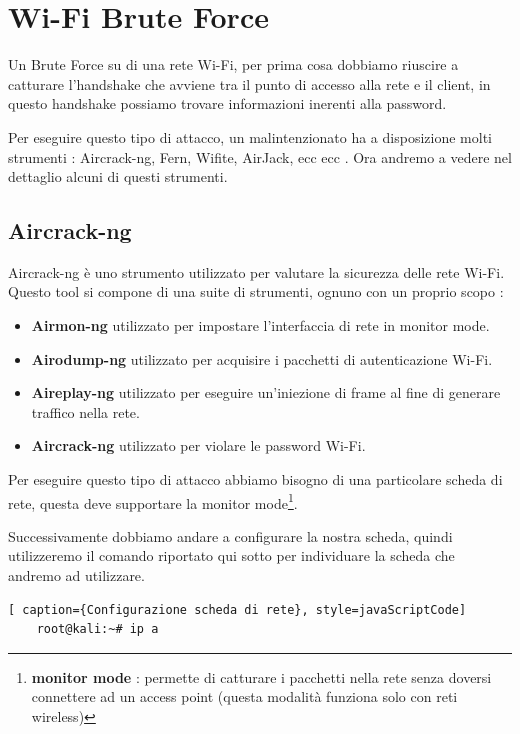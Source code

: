 \chapter{Wi-Fi Brute Force}

Un Brute Force su di una rete Wi-Fi, per prima cosa dobbiamo riuscire a catturare l'handshake che avviene tra il punto di accesso alla rete e il client, in questo handshake possiamo trovare informazioni inerenti alla password.

Per eseguire questo tipo di attacco, un malintenzionato ha a disposizione molti strumenti : Aircrack-ng, Fern, Wifite, AirJack, ecc ecc . Ora andremo a vedere nel dettaglio alcuni di questi strumenti.

\section{Aircrack-ng}

Aircrack-ng\cite{aircrack} è uno strumento utilizzato per valutare la sicurezza delle rete Wi-Fi. Questo tool si compone di una suite di strumenti, ognuno con un proprio scopo :
\begin{itemize}
    \item \textbf{Airmon-ng} utilizzato per impostare l'interfaccia di rete in monitor mode. 
    \item \textbf{Airodump-ng} utilizzato per acquisire i pacchetti di autenticazione Wi-Fi.
    \item \textbf{Aireplay-ng} utilizzato per eseguire un'iniezione di frame al fine di generare traffico nella rete.
    \item \textbf{Aircrack-ng} utilizzato per violare le password Wi-Fi.
\end{itemize}

Per eseguire questo tipo di attacco abbiamo bisogno di una particolare scheda di rete, questa deve supportare la monitor mode\footnote[1]{\textbf{monitor mode} : permette di catturare i pacchetti nella rete senza doversi connettere ad un access point (questa modalità funziona solo con reti wireless)}.

Successivamente dobbiamo andare a configurare la nostra scheda, quindi utilizzeremo il comando riportato qui sotto per individuare la scheda che andremo ad utilizzare.

\begin{lstlisting}[ caption={Configurazione scheda di rete}, style=javaScriptCode]
	root@kali:~# ip a
\end{lstlisting}

